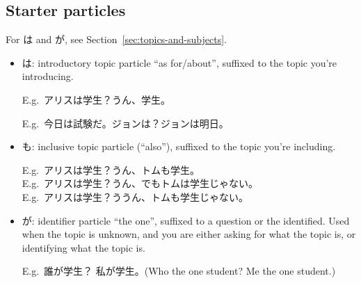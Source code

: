 \documentclass[../nihongo-gakushuu-kyouzai.tex]{subfiles}
\begin{document}
\subsection{Starter particles} \label{sec:particles}
For は and が, see Section~\ref{sec:topics-and-subjects}.
\begin{itemize}
    \item は: introductory topic particle ``as for/about'', suffixed to the topic you're introducing.

    E.g.\ アリスは学生？うん、学生。

    E.g.\ 今日は試験だ。ジョンは？ジョンは明日。
    \item も: inclusive topic particle (``also''), suffixed to the topic you're including.

    E.g.\ アリスは学生？うん、トムも学生。\\
    E.g.\ アリスは学生？うん、でもトムは学生じゃない。\\
    E.g.\ アリスは学生？ううん、トムも学生じゃない。
    \item が: identifier particle ``the one'', suffixed to a question or the identified. Used when the topic is unknown, and you are either asking for what the topic is, or identifying what the topic is.

    E.g.\ 誰が学生？ 私が学生。(Who the one student? Me the one student.)\\
\end{itemize}
\end{document}
